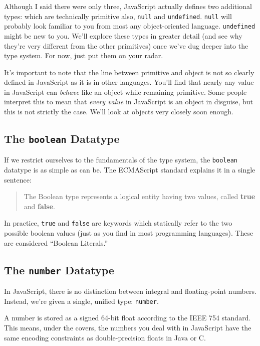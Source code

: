 \documentclass[11pt,letter]{book}
\begin{document}
    Although I said there were only three, JavaScript actually defines two additional types: which
    are technically primitive also, \texttt{null} and \texttt{undefined}. \texttt{null} will 
    probably look familiar to you from most any object-oriented language. \texttt{undefined} might 
    be new to you. We'll explore these types in greater detail (and see why they're very different 
    from the other primitives) once we've dug deeper into the type system. For now, just put them on 
    your radar.
    
    It's important to note that the line between primitive and object is not so clearly defined
    in JavaScript as it is in other languages. You'll find that nearly any value in JavaScript can
    \emph{behave} like an object while remaining primitive. Some people interpret this to mean that
    \emph{every value} in JavaScript is an object in disguise, but this is not strictly the case.
    We'll look at objects very closely soon enough.
    
    \subsection{The \texttt{boolean} Datatype}
    If we restrict ourselves to the fundamentals of the type system, the \texttt{boolean} 
    datatype is as simple as can be. The ECMAScript standard explains it in a single sentence:
    
    \begin{quote}
        The Boolean type represents a logical entity having two values, called \textbf{true}
        and \textbf{false}.
    \end{quote}
    
    In practice, \texttt{true} and \texttt{false} are keywords which  statically refer to the two 
    possible boolean values (just as you find in most programming languages). These are considered 
    ``Boolean Literals.''
    
    \subsection{The \texttt{number} Datatype}
    In JavaScript, there is no distinction between integral and floating-point numbers. Instead, 
    we're given a single, unified type: \texttt{number}.
    
    A number is stored as a signed 64-bit float according to the IEEE 754 standard. This means, 
    under the covers, the numbers you deal with in JavaScript have the same encoding constraints as 
    double-precision floats in Java or C.
    
\end{document}
